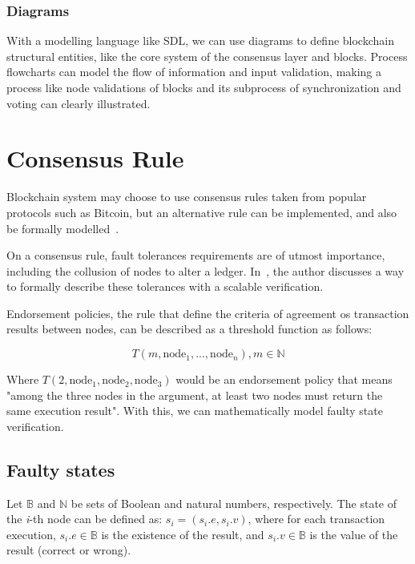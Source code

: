 \documentclass[sigconf, nonacm]{acmart}
\begin{document}
  \subsubsection{Diagrams}
  With a modelling language like SDL, we can use diagrams to define blockchain structural entities, like the core system of the consensus layer
  and blocks. Process flowcharts can model the flow of information and input validation, making a process like
  node validations of blocks and its subprocess of synchronization and voting can clearly illustrated.

\section{Consensus Rule}
Blockchain system may choose to use consensus rules taken from popular protocols such as Bitcoin,
but an alternative rule can be implemented, and also be formally modelled~\cite{Kawahara2020}.

On a consensus rule, fault tolerances requirements are of utmost importance, including the collusion of nodes to alter a ledger.
In~\cite{Kawahara2020}, the author discusses a way to formally describe these tolerances with a scalable verification.

Endorsement policies, the rule that define the criteria of agreement os transaction results between nodes, can be described
as a threshold function as follows:

\begin{displaymath}
  T(m,\textrm{node}_1,... ,\textrm{node}_n), m \in \mathbb{N}
\end{displaymath}
\linebreak[1]

Where $T(2,\textrm{node}_1,\textrm{node}_2,\textrm{node}_3)$ would be an endorsement policy
that means "among the three nodes in the argument, at least two nodes must return the same execution result".
With this, we can mathematically model faulty state verification.

\subsection{Faulty states}
Let $\mathbb{B}$ and $\mathbb{N}$ be sets of Boolean and natural numbers, respectively. The state of the \textit{i}-th node can be defined as:
$s_i = (s_i.e,s_i.v)$, where for each transaction execution, $s_i.e \in \mathbb{B}$ is the  existence of the result,
and $s_i.v \in \mathbb{B}$ is the value of the result (correct or wrong).
\end{document}
